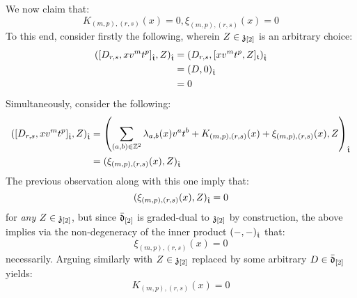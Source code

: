 \begin{remark}
\begin{itemize}
                    We now claim that:
                        $$K_{(m, p), (r, s)}(x) = 0, \xi_{(m, p), (r, s)}(x) = 0$$
                    To this end, consider firstly the following, wherein $Z \in \mathfrak{z}_{[2]}$ is an arbitrary choice:
                        $$
                            \begin{aligned}
                                ( [D_{r, s}, x v^m t^p]_{\hat{\mathfrak{t}}}, Z )_{\hat{\mathfrak{t}}} & = ( D_{r, s}, [x v^m t^p, Z]_{\mathfrak{t}} )_{\hat{\mathfrak{t}}}
                                \\
                                & = (D, 0)_{\hat{\mathfrak{t}}}
                                \\
                                & = 0
                            \end{aligned}
                        $$
                    Simultaneously, consider the following:
                        $$
                            \begin{aligned}
                                ( [D_{r, s}, x v^m t^p]_{\hat{\mathfrak{t}}}, Z )_{\hat{\mathfrak{t}}} & = \left( \sum_{(a, b) \in \mathbb{Z}^2} \lambda_{a, b}(x) v^a t^b + K_{(m, p), (r, s)}(x) + \xi_{(m, p), (r, s)}(x), Z \right)_{\hat{\mathfrak{t}}}
                                \\
                                & = ( \xi_{(m, p), (r, s)}(x), Z )_{\hat{\mathfrak{t}}}
                            \end{aligned}
                        $$
                    The previous observation along with this one imply that:
                        $$( \xi_{(m, p), (r, s)}(x), Z )_{\hat{\mathfrak{t}}} = 0$$
                    for \textit{any} $Z \in \mathfrak{z}_{[2]}$, but since $\bar{\mathfrak{d}}_{[2]}$ is graded-dual to $\mathfrak{z}_{[2]}$ by construction, the above implies via the non-degeneracy of the inner product $(-, -)_{\hat{\mathfrak{t}}}$ that:
                        $$\xi_{(m, p), (r, s)}(x) = 0$$
                    necessarily. Arguing similarly with $Z \in \mathfrak{z}_{[2]}$ replaced by some arbitrary $D \in \bar{\mathfrak{d}}_{[2]}$ yields:
                        $$K_{(m, p), (r, s)}(x) = 0$$


\end{itemize}
\end{remark}
